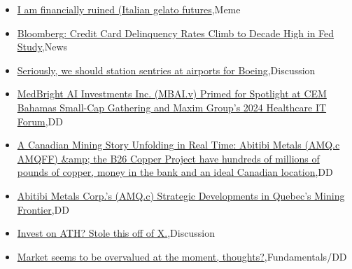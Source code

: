 \documentclass{article}%
\begin{document}
%
\begin{itemize}%
\item%
\href{https://reddit.com/r/wallstreetbets/comments/19dkpvc/i\_am\_financially\_ruined\_italian\_gelato\_futures/}{I am financially ruined (Italian gelato futures},Meme%
\item%
\href{https://reddit.com/r/wallstreetbets/comments/19dieuh/bloomberg\_credit\_card\_delinquency\_rates\_climb\_to/}{Bloomberg: Credit Card Delinquency Rates Climb to Decade High in Fed Study},News%
\item%
\href{https://reddit.com/r/wallstreetbets/comments/19dgwqy/seriously\_we\_should\_station\_sentries\_at\_airports/}{Seriously, we should station sentries at airports for Boeing},Discussion%
\item%
\href{https://reddit.com/r/Baystreetbets/comments/19dbk9v/medbright\_ai\_investments\_inc\_mbaiv\_primed\_for/}{MedBright AI Investments Inc. (MBAI.v) Primed for Spotlight at CEM Bahamas Small-Cap Gathering and Maxim Group's 2024 Healthcare IT Forum},DD%
\item%
\href{https://reddit.com/r/Baystreetbets/comments/19d9c23/a\_canadian\_mining\_story\_unfolding\_in\_real\_time/}{A Canadian Mining Story Unfolding in Real Time: Abitibi Metals (AMQ.c AMQFF) \&amp; the B26 Copper Project have hundreds of millions of pounds of copper, money in the bank and an ideal Canadian location},DD%
\item%
\href{https://reddit.com/r/Baystreetbets/comments/19d87y3/abitibi\_metals\_corps\_amqc\_strategic\_developments/}{Abitibi Metals Corp.'s (AMQ.c) Strategic Developments in Quebec's Mining Frontier},DD%
\item%
\href{https://reddit.com/r/StockMarket/comments/19dduuk/invest\_on\_ath\_stole\_this\_off\_of\_x/}{Invest on ATH? Stole this off of X.},Discussion%
\item%
\href{https://reddit.com/r/StockMarket/comments/19d4yko/market\_seems\_to\_be\_overvalued\_at\_the\_moment/}{Market seems to be overvalued at the moment, thoughts?},Fundamentals/DD%
\end{itemize}%
\end{document}
